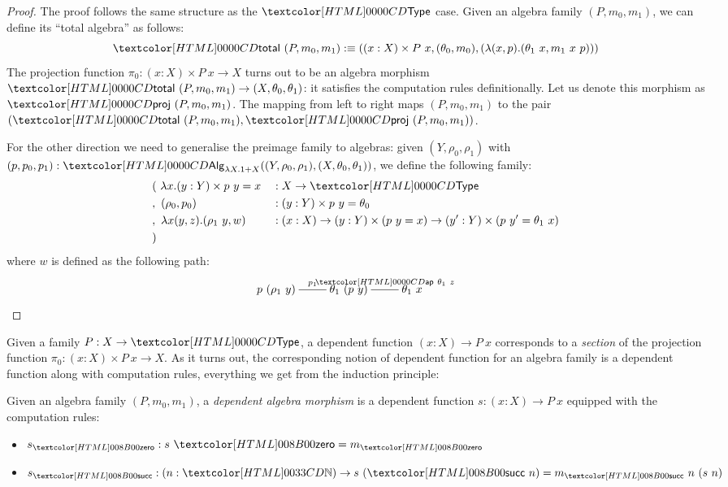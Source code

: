 \begin{proof}
  The proof follows the same structure as the $\Type$ case. Given an
  algebra family $(P,m_0,m_1)$, we can define its ``total algebra'' as
  follows:
  $$
  \total\ (P,m_0,m_1) \ddefeq ((x : X) \times P\ x , (\theta_0, m_0), (\lambda (x,p) . (\theta_1\ x, m_1\ x\ p)))
  $$
  The projection function $\pi_0 : (x : X) \times P\ x \to X$ turns
  out to be an algebra morphism
  $\total\ (P,m_0,m_1) \to (X,\theta_0,\theta_1)$: it satisfies the
  computation rules definitionally. Let us denote this morphism as
  $\proj\ (P,m_0,m_1)$. The mapping from left to right maps
  $(P,m_0,m_1)$ to the pair
  $(\total\ (P,m_0,m_1), \proj\ (P,m_0,m_1))$.

  For the other direction we need to generalise the preimage family to
  algebras: given $(Y,\rho_0,\rho_1)$ with
  $(p,p_0,p_1) : \Alg_{\lambda X . 1 +
    X}((Y,\rho_0,\rho_1),(X,\theta_0,\theta_1))$,
  we define the following family:
  \begin{align*}
  &(\ \lambda x . (y : Y) \times p\ y = x &&: X \to \Type \\
  &,\ (\rho_0 , p_0) &&: (y : Y) \times p\ y = \theta_0 \\
  &,\ \lambda x (y,z) . (\rho_1\ y , w) &&: (x : X) \to (y : Y) \times (p\ y = x) \to (y' : Y) \times (p\ y' = \theta_1\ x)\\
  &)
  \end{align*}
  where $w$ is defined as the following path:
  $$
  \xymatrix{
    p\ (\rho_1\ y) \ar@{-}[r]^-{p_1} &\theta_1\ (p\ y) \ar@{-}^-{\ap\ \theta_1\ z}[r] &\theta_1\ x
  }
  $$
\end{proof}

Given a family $P : X \to \Type$, a dependent function
$(x : X) \to P\ x$ corresponds to a \emph{section} of the projection
function $\pi_0 : (x : X) \times P\ x \to X$. As it turns out, the
corresponding notion of dependent function for an algebra family is a
dependent function along with computation rules, \ie everything we get
from the induction principle:

\begin{definition}
  Given an algebra family $(P,m_0,m_1)$, a \emph{dependent algebra
    morphism} is a dependent function $s : (x : X) \to P\ x$ equipped
  with the computation rules:
  \begin{itemize}
  \item $s_{\natzero} : s\ \natzero = m_{\natzero}$
  \item $s_{\natsucc} : (n : \natty) \to s\ (\natsucc\ n) = m_{\natsucc}\ n\ (s\ n)$
  \end{itemize}
\end{definition}

